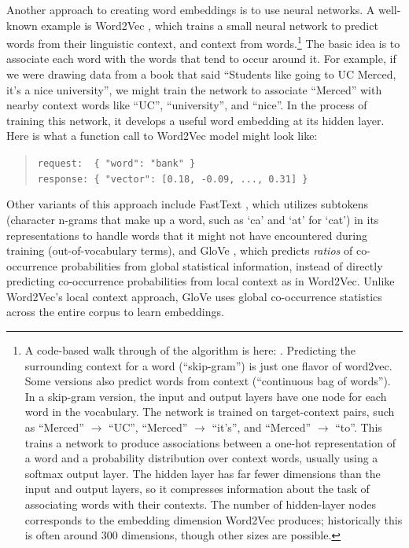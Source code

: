 Another approach to creating word embeddings is to use neural networks. A well-known example is Word2Vec \cite{mikolov2013distributed}, which trains a small neural network to predict words from their linguistic context, and context from words.\footnote{A code-based walk through of the algorithm is here: . Predicting the surrounding context for a word (``skip-gram'') is just one flavor of word2vec. Some versions also predict words from context (``continuous bag of words''). In a skip-gram version, the input and output layers have one node for each word in the vocabulary. The network is trained on target-context pairs, such as ``Merced'' $\longrightarrow$ ``UC'', ``Merced'' $\longrightarrow$ ``it's'', and ``Merced'' $\longrightarrow$ ``to''. This trains a network to produce associations between a one-hot representation of a word and a probability distribution over context words, usually using a softmax output layer. The hidden layer has far fewer dimensions than the input and output layers, so it compresses information about the task of associating words with their contexts. The number of hidden-layer nodes corresponds to the embedding dimension Word2Vec produces; historically this is often around 300 dimensions, though other sizes are possible.} The basic idea is to associate each word with the words that tend to occur around it. For example, if we were drawing data from a book that said ``Students like going to UC Merced, it's a nice university'', we might train the network to associate ``Merced'' with nearby context words like ``UC'', ``university'', and ``nice''. In the process of training this network, it develops a useful word embedding at its hidden layer. Here is what a function call to Word2Vec model might look like:

\begin{quote}
\verb|request:  { "word": "bank" }|\\
\verb|response: { "vector": [0.18, -0.09, ..., 0.31] }|
\end{quote}

Other variants of this approach include FastText \cite{bojanowski2016enriching}, which utilizes subtokens (character n-grams that make up a word, such as `ca' and `at' for `cat') in its representations to handle words that it might not have encountered during training (out-of-vocabulary terms), and GloVe \cite{pennington2014glove}, which predicts \textit{ratios} of co-occurrence probabilities from global statistical information, instead of directly predicting co-occurrence probabilities from local context as in Word2Vec. Unlike Word2Vec's local context approach, GloVe uses global co-occurrence statistics across the entire corpus to learn embeddings.

